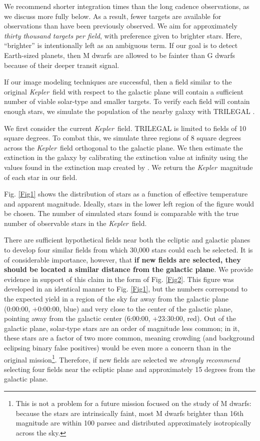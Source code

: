 \documentclass[12pt, preprint]{aastex}
\newcommand{\observatory}[1]{\textsl{#1}}
\newcommand{\kepler}{\observatory{Kepler}}
\newcommand{\Kepler}{\kepler}
\begin{document}
We recommend shorter integration times than the long cadence observations, 
 as we discuss more fully below. 
As a result, fewer targets are available for observations than have been 
 previously observed. 
We aim for approximately \emph{thirty thousand targets per field}, with 
 preference given to brighter stars. 
Here, ``brighter'' is intentionally left as an ambiguous term. If our goal is to detect Earth-sized planets, then M dwarfs are allowed
 to be fainter than G dwarfs because of their deeper transit signal. 

If our image modeling techniques are successful, then a field similar to the 
 original \Kepler\ field with respect to the galactic plane will contain 
 a sufficient number of viable solar-type and smaller targets. 
To verify each field will contain enough stars, we simulate the population 
 of the nearby galaxy with TRILEGAL \citep{Girardi05}. 

We first consider the current \Kepler\ field. 
TRILEGAL is limited to fields of 10 square degrees. 
To combat this, we simulate three regions of 8 square degrees across the 
 \Kepler\ field orthogonal to the galactic plane. 
We then estimate the extinction in the galaxy by calibrating the extinction 
 value at infinity using the values found in the extinction map created by 
 \cite{Schlegel98}. 
We return the \Kepler\ magnitude of each star in our field.

Fig. \ref{Fig1} shows the distribution of stars as a function of effective 
 temperature and apparent magnitude. 
Ideally, stars in the lower left region of the figure would be chosen. 
The number of simulated stars found is comparable with the true number of 
 observable stars in the \Kepler\ field.

There are sufficient hypothetical fields near both the ecliptic and galactic 
 planes to develop four similar fields from which 30,000 stars could each 
 be selected. 
It is of considerable importance, however, that \textbf{if new fields are 
 selected, they should be located a similar distance from the galactic plane}. 
We provide evidence in support of this claim in the form of Fig. \ref{Fig2}. 
This figure was developed in an identical manner to Fig. \ref{Fig1}, but 
 the numbers correspond to the expected yield in a region of the sky far away
 from the galactic plane (0:00:00, +0:00:00, blue) and very close to the center
 of the galactic plane, pointing away from the galactic center (6:00:00, 
 +23:30:00, red). 
Out of the galactic plane, solar-type stars are an order of magnitude less 
 common; in it, these stars are a factor of two more common, meaning crowding
 (and background eclipsing binary false positives) would be even more a concern
 than in the original mission\footnote{This is not a problem for a future
 mission focused on the study of M dwarfs: because the stars are intrinsically
 faint, most M dwarfs brighter than 16th magnitude are within 100 parsec
 and distributed approximately isotropically across the sky.}.
Therefore, if new fields are selected we \emph{strongly recommend} selecting 
 four fields near the ecliptic plane and approximately 15 degrees from the 
 galactic plane. 
 
\end{document}
